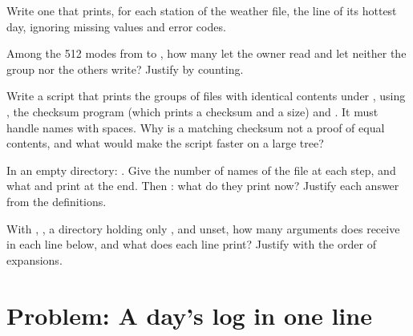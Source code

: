 \begin{exercise}[$\star\star$]\label{exo:b1:the-shell:8}
Write one  that prints, for each station of the weather file, the line of its hottest day, ignoring missing
values and error codes.
\end{exercise}

\begin{exercise}[$\star\star$]\label{exo:b1:the-shell:9}
Among the 512 modes from  to , how many let the owner read and let neither the group nor the others
write? Justify by counting.
\end{exercise}

\begin{exercise}[$\star\star\star$]\label{exo:b1:the-shell:10}
Write a script  that prints the groups of files with identical contents under , using
, the checksum program  (which prints a checksum and a size) and . It must handle names
with spaces. Why is a matching checksum not a proof of equal contents, and what would make the script faster on a
large tree?
\end{exercise}

\begin{exercise}[$\star\star\star$]\label{exo:b1:the-shell:11}
In an empty directory: . Give the number of names of the file at each step,
and what  and  print at the end. Then : what do they print now? Justify each
answer from the definitions.
\end{exercise}

\begin{exercise}[$\star\star\star$]\label{exo:b1:the-shell:12}
With , , a directory holding only , and  unset, how many arguments
does  receive in each line below, and what does each line print? Justify with the order of expansions.
\end{exercise}

\section{Problem: A day's log in one line}\label{sec:b1:the-shell:problem}

